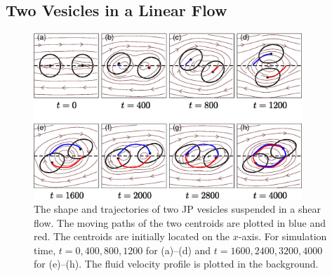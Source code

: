 \documentclass[lineno]{jfm}
\begin{document}
\subsection{Two Vesicles in a Linear Flow}

\begin{figure}
\begin{center}
  \includegraphics[width=0.9\textwidth]{ShearTraj.eps}
\end{center} 
  \caption{\label{figure9} The shape and trajectories of two
  JP vesicles suspended in a shear flow. The moving paths of the two
  centroids are plotted in blue and red. The centroids are initially
  located on the $x$-axis. For simulation time, $t = {0, 400,800,1200}$
  for (a)--(d) and $t = {1600, 2400, 3200, 4000}$ for (e)--(h).
  The fluid velocity profile is plotted in the background.
  }
\end{figure}
\end{document}
